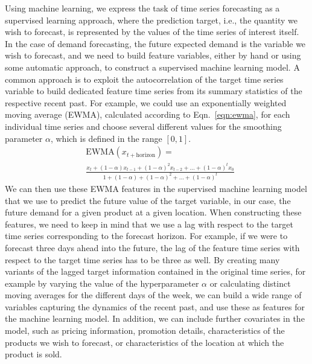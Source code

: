 \documentclass[BCOR=1mm, DIV=calc,10pt,
twoside=true,
twocolumn,
headings=normal]{scrartcl}
\newcommand{\eqn}{Eqn.~}
\begin{document}
Using machine learning, we express the task of time series forecasting as a supervised learning approach, where the prediction target, i.e., the quantity we wish to forecast, is represented by the values of the time series of interest itself. In the case of demand forecasting, the future expected demand is the variable we wish to forecast, and we need to build feature variables, either by hand or using some automatic approach, to construct a supervised machine learning model. A common approach is to exploit the autocorrelation of the target time series variable to build dedicated feature time series from its summary statistics of the respective recent past. For example, we could use an exponentially weighted moving average (EWMA), calculated according to \eqn \eqref{eqn:ewma}, for each individual time series and choose several different values for the smoothing parameter $\alpha$, which is defined in the range $[0, 1]$.
\begin{equation} \label{eqn:ewma}
\begin{split}
&\mathrm{EWMA}(x_{t+\mathrm{horizon}}) = \\ &\frac{x_t + (1 - \alpha) x_{t-1} + (1 - \alpha)^2 x_{t-2} + ... + (1 - \alpha)^t x_0}{1 + (1 - \alpha) + (1 - \alpha)^2 + ... + (1 - \alpha)^t}
\end{split}
\end{equation}
We can then use these EWMA features in the supervised machine learning model that we use to predict the future value of the target variable, in our case, the future demand for a given product at a given location. When constructing these features, we need to keep in mind that we use a lag with respect to the target time series corresponding to the forecast horizon. For example, if we were to forecast three days ahead into the future, the lag of the feature time series with respect to the target time series has to be three as well. By creating many variants of the lagged target information contained in the original time series, for example by varying the value of the hyperparameter $\alpha$ or calculating distinct moving averages for the different days of the week, we can build a wide range of variables capturing the dynamics of the recent past, and use these as features for the machine learning model. In addition, we can include further covariates in the model, such as pricing information, promotion details, characteristics of the products we wish to forecast, or characteristics of the location at which the product is sold.
\end{document}
